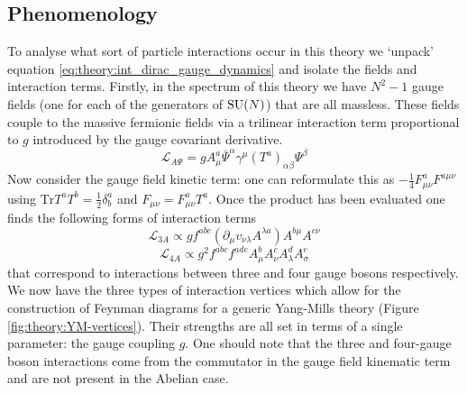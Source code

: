 \subsection{Phenomenology}
To analyse what sort of particle interactions occur in this theory we `unpack' equation \ref{eq:theory:int_dirac_gauge_dynamics} and isolate the fields and interaction terms. 
Firstly, in the spectrum of this theory we have $N^{2}-1$ gauge fields (one for each of the generators of ${\mathrm{SU}(N)}$) that are all massless. 
These fields couple to the massive fermionic fields via a trilinear interaction term proportional to $g$ introduced by the gauge covariant derivative.
\begin{equation}
    \mathcal{L}_{{A}\Psi} = gA_{\mu}^{a}\bar{\Psi}^{\alpha}\gamma^{\mu}(T^{a})_{\alpha\beta}\Psi^{\beta}
\end{equation}
Now consider the gauge field kinetic term: one can reformulate this as $-\frac{1}{4}F^{a}_{\mu\nu}F^{a\mu\nu}$ using $\mathrm{Tr}T^{a}T^{b} = \frac{1}{2}\delta^{a}_{b}$ and $F_{\mu\nu} = F^{a}_{\mu\nu}T^{a}$. 
Once the product has been evaluated one finds the following forms of interaction terms
\begin{equation}
    \mathcal{L}_{3A} \propto gf^{abc}(\partial_{\mu}v_{\nu\lambda}A^{\lambda{a}})A^{b\mu}A^{c\nu} 
\end{equation}
%
\begin{equation}
    \mathcal{L}_{4A} \propto g^{2}f^{abc}f^{ade}A_{\mu}^{b}A_{\nu}^{c}A_{\lambda}^{d}A_{\sigma}^{e}
\end{equation}
%
that correspond to interactions between three and four gauge bosons respectively. 
We now have the three types of interaction vertices which allow for the construction of Feynman diagrams for a generic Yang-Mills theory (Figure \ref{fig:theory:YM-vertices}). 
Their strengths are all set in terms of a single parameter: the gauge coupling $g$.
One should note that the three and four-gauge boson interactions come from the commutator in the gauge field kinematic term and are not present in the Abelian case. 

